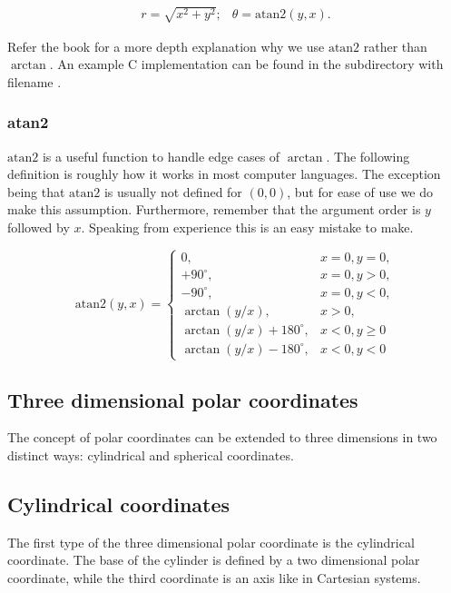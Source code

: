 \documentclass[a4paper,11pt]{article}
\begin{document}
$$
\begin{array}{lr}
r=\sqrt{x^2+y^2}; & \theta=\text{atan2}(y,x).
\end{array}
$$

Refer the book for a more depth explanation why we use $\text{atan2}$ rather than $\arctan$. An example C implementation can be found in the  subdirectory with filename .

\subsubsection{atan2}

$\text{atan2}$ is a useful function to handle edge cases of $\arctan$. The following definition is roughly how it works in most computer languages. The exception being that $\text{atan2}$ is usually not defined for $(0,0)$, but for ease of use we do make this assumption. Furthermore, remember that the argument order is $y$ followed by $x$. Speaking from experience this is an easy mistake to make.

\begin{equation*}
	\text{atan2}(y,x) =
	\begin{cases}
		0, & x=0,y=0, \\
		+90^\circ, & x=0,y>0, \\
		-90^\circ, & x=0,y<0, \\
		\arctan(y/x), & x>0, \\
		\arctan(y/x)+180^\circ, & x<0,y\geq 0 \\
		\arctan(y/x)-180^\circ, & x<0,y<0
	\end{cases}
\end{equation*}

\subsection{Three dimensional polar coordinates}

The concept of polar coordinates can be extended to three dimensions in two distinct ways: cylindrical and spherical coordinates.

\subsection{Cylindrical coordinates}

The first type of the three dimensional polar coordinate is the cylindrical coordinate. The base of the cylinder is defined by a two dimensional polar coordinate, while the third coordinate is an axis like in Cartesian systems.
\end{document}
